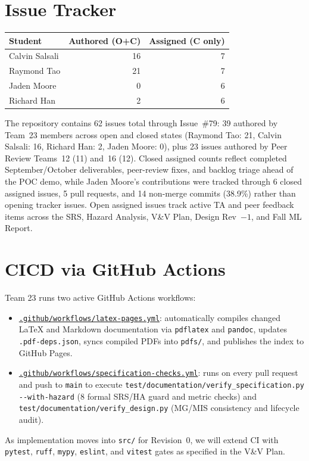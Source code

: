 \documentclass{article}
\begin{document}
\section{Issue Tracker}

\begin{table}[H]
\centering
\begin{tabular}{lrr}
\toprule
\textbf{Student} & \textbf{Authored (O+C)} & \textbf{Assigned (C only)}\\
\midrule
Calvin Salsali & 16 & 7 \\
Raymond Tao & 21 & 7 \\
Jaden Moore & 0 & 6 \\
Richard Han & 2 & 6 \\
\bottomrule
\end{tabular}
\end{table}

The repository contains 62 issues total through Issue~\#79: 39 authored by Team~23 members across open and closed states (Raymond Tao: 21, Calvin Salsali: 16, Richard Han: 2, Jaden Moore: 0), plus 23 issues authored by Peer Review Teams~12 (11) and~16 (12). Closed assigned counts reflect completed September/October deliverables, peer-review fixes, and backlog triage ahead of the POC demo, while Jaden Moore's contributions were tracked through 6 closed assigned issues, 5 pull requests, and 14 non-merge commits (38.9\%) rather than opening tracker issues. Open assigned issues track active TA and peer feedback items across the SRS, Hazard Analysis, V\&V Plan, Design Rev~$-1$, and Fall ML Report.

\section{CICD via GitHub Actions}

Team 23 runs two active GitHub Actions workflows:
\begin{itemize}
    \item \href{https://github.com/richy1337/Verity/blob/main/.github/workflows/latex-pages.yml}{\texttt{.github/\allowbreak{}workflows/\allowbreak{}latex-pages.yml}}: automatically compiles changed \LaTeX{} and Markdown documentation via \texttt{pdflatex} and \texttt{pandoc}, updates \texttt{.pdf-deps.json}, syncs compiled PDFs into \texttt{pdfs/}, and publishes the index to GitHub Pages.
    \item \href{https://github.com/richy1337/Verity/blob/main/.github/workflows/specification-checks.yml}{\texttt{.github/\allowbreak{}workflows/\allowbreak{}specification-checks.yml}}: runs on every pull request and push to \texttt{main} to execute \texttt{test/\allowbreak{}documentation/\allowbreak{}verify\_\allowbreak{}specification.py -{}-with-hazard} (8 formal SRS/HA guard and metric checks) and \texttt{test/\allowbreak{}documentation/\allowbreak{}verify\_\allowbreak{}design.py} (MG/MIS consistency and lifecycle audit).
\end{itemize}
As implementation moves into \texttt{src/} for Revision~0, we will extend CI with \texttt{pytest}, \texttt{ruff}, \texttt{mypy}, \texttt{eslint}, and \texttt{vitest} gates as specified in the V\&V Plan.
\end{document}
